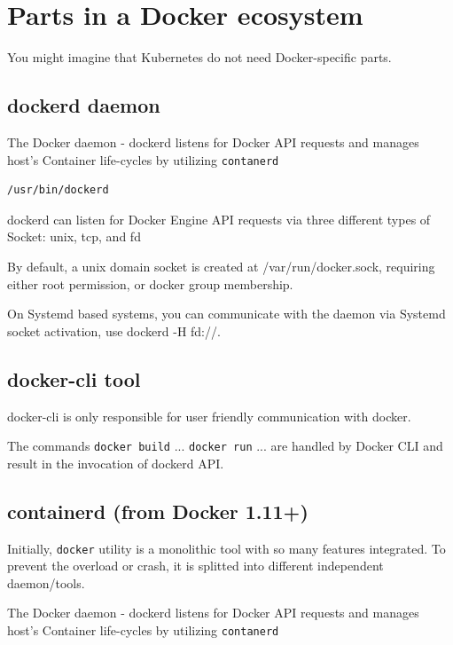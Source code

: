 \section{Parts in a Docker ecosystem}


You might imagine that Kubernetes do not need Docker-specific parts.

\subsection{dockerd daemon}

The Docker daemon - dockerd listens for Docker API requests and manages host's
Container life-cycles by utilizing \verb!contanerd!
\begin{verbatim}
/usr/bin/dockerd

\end{verbatim}
dockerd can listen for Docker Engine API requests via three different types of Socket: unix, tcp, and fd


By default, a unix domain socket is created at /var/run/docker.sock, requiring
either root permission, or docker group membership.

On Systemd based systems, you can communicate with the daemon via Systemd
socket activation, use dockerd -H fd://.
 


\subsection{docker-cli tool}
\label{sec:docker-cli-tool}

docker-cli is only responsible for user friendly communication with docker.

The commands \verb!docker build! ... \verb!docker run! ... are handled by Docker
CLI and result in the invocation of dockerd API.

 
\subsection{containerd (from Docker 1.11+)}
\label{sec:containerd}

Initially, \verb!docker! utility is a monolithic tool with so many features integrated. 
To prevent the overload or crash, it is splitted into different independent daemon/tools.

The Docker daemon - dockerd listens for Docker API requests and manages host's
Container life-cycles by utilizing \verb!contanerd!

